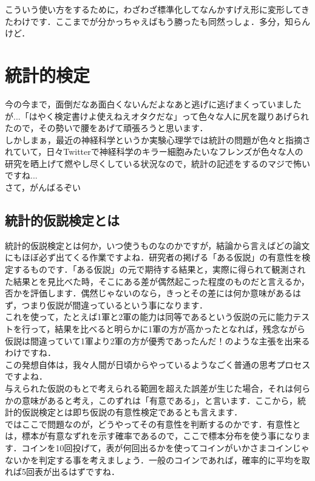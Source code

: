 \documentclass[11pt,a4paper,uplatex]{ujreport} 	%
\begin{document}
こういう使い方をするために，わざわざ標準化してなんかすげえ形に変形してきたわけです．ここまでが分かっちゃえばもう勝ったも同然っしょ．多分，知らんけど．

\chapter{統計的検定}
今の今まで，面倒だなあ面白くないんだよなあと逃げに逃げまくっていましたが...「はやく検定書けよ使えねえオタクだな」って色々な人に尻を蹴りあげられたので，その勢いで腰をあげて頑張ろうと思います．\\

しかしまぁ，最近の神経科学というか実験心理学では統計の問題が色々と指摘されていて，日々Twitterで神経科学のキラー細胞みたいなフレンズが色々な人の研究を晒上げて燃やし尽くしている状況なので，統計の記述をするのマジで怖いですね...\\


さて，がんばるぞい\\

\section{統計的仮説検定とは}
統計的仮説検定とは何か，いつ使うものなのかですが，結論から言えばどの論文にもほぼ必ず出てくる作業ですよね．研究者の掲げる「ある仮説」の有意性を検定するものです．「ある仮説」の元で期待する結果と，実際に得られて観測された結果とを見比べた時，そこにある差が偶然起こった程度のものだと言えるか，否かを評価します．偶然じゃないのなら，きっとその差には何か意味があるはず，つまり仮説が間違っているという事になります．\\

これを使って，たとえば1軍と2軍の能力は同等であるという仮説の元に能力テストを行って，結果を比べると明らかに1軍の方が高かったとなれば，残念ながら仮説は間違っていて1軍より2軍の方が優秀であったんだ！のような主張を出来るわけですね．\\

この発想自体は，我々人間が日頃からやっているようなごく普通の思考プロセスですよね．\\

与えられた仮説のもとで考えられる範囲を超えた誤差が生じた場合，それは何らかの意味があると考え，このずれは「有意である」，と言います．ここから，統計的仮説検定とは即ち仮説の有意性検定であるとも言えます．\\

ではここで問題なのが，どうやってその有意性を判断するのかです．有意性とは，標本が有意なずれを示す確率であるので，ここで標本分布を使う事になります．コインを10回投げて，表が何回出るかを使ってコインがいかさまコインじゃないかを判定する事を考えましょう．一般のコインであれば，確率的に平均を取れば5回表が出るはずですね．
\end{document}
